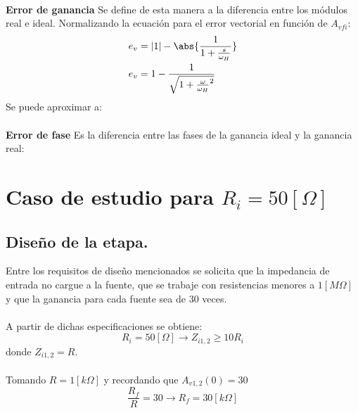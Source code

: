\documentclass[11pt, a4paper]{article}
\begin{document}
\paragraph{}
\textbf{Error de ganancia}
\onehalfspacing
Se define de esta manera a la diferencia entre los módulos real e ideal. Normalizando la ecuación para el error vectorial en función de $A_{vfi}$:
\begin{align}
    \nonumber
    e_v&=|1| - \abs{\frac{1}{1+\frac{s}{\omega_H}}} \\
    \nonumber
    e_v &= 1 - \frac{1}{\sqrt{1+\frac{\omega}{\omega_H}^2}}
\end{align}
Se puede aproximar a:
\begin{center}
\end{center}

\paragraph{}
\textbf{Error de fase}
\onehalfspacing
Es la diferencia entre las fases de la ganancia ideal y la ganancia real:
\begin{center}
\end{center}
\newpage

\section{Caso de estudio para $R_i=50[\Omega]$}

\subsection{Diseño de la etapa.}
\onehalfspacing
Entre los requisitos de diseño mencionados se solicita que la impedancia de entrada no cargue a la fuente, que se trabaje con resistencias menores a $1[M\Omega]$ y que la ganancia para cada fuente sea de $30$ veces.
\paragraph{}
A partir de dichas especificaciones se obtiene:
\begin{equation}
    \nonumber
    R_i=50[\Omega] \longrightarrow Z_{i1,2} \geq 10R_i
\end{equation}
donde $Z_{i1,2} = R$.
\paragraph{}
Tomando $R=1[k\Omega]$ y recordando que $A_{v1,2}(0)=30$
\begin{equation}
    \nonumber
    \frac{R_f}{R}=30 \longrightarrow R_f=30[k\Omega]
\end{equation}
\end{document}
